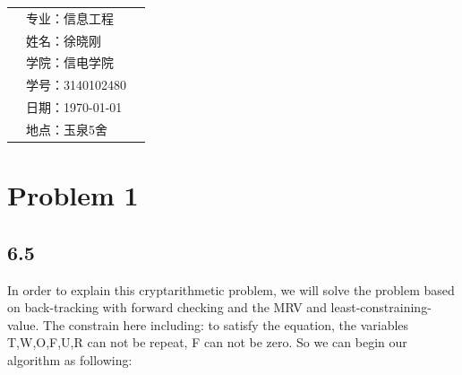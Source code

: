 \documentclass[a4paper,left=2.5cm,right=2.5cm,11pt]{article}
\newcommand{\xiaoerhao}{\fontsize{19.3pt}{\baselineskip}\selectfont}
\begin{document}
	
   \begin{longtable}{p{12cm}p{5cm}p{5cm}}
	\multirow{6}{*}{ \xiaoerhao  \color{red}{Artificial intelligence}} \multirow{6}{*}{ \xiaoerhao Homework3 \space \space \space \space} & 专业：信息工程 \\
	& 姓名：徐晓刚 \\
	& 学院：信电学院 \\
	& 学号：3140102480 \\
	& 日期：\today \\
	& 地点：玉泉5舍 \\
\end{longtable}

\section*{Problem 1}
\subsection*{6.5}
In order to explain this cryptarithmetic problem, we will solve the problem based on back-tracking with forward checking and the MRV and least-constraining-value.
The constrain here including: to satisfy the equation, the variables T,W,O,F,U,R can not be repeat, F can not be zero.
So we can begin our algorithm as following:
\end{document}
